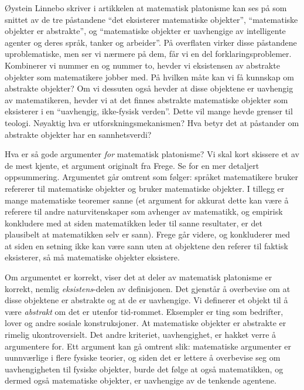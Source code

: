 \documentclass[12pt, norsk]{article}
\begin{document}
Øystein Linnebo skriver i artikkelen \cite{platonism} at matematisk platonisme kan ses på som snittet av de tre påstandene ``det eksisterer matematiske objekter'', ``matematiske objekter er abstrakte'', og ``matematiske objekter er uavhengige av intelligente agenter og deres språk, tanker og arbeider''. På overflaten virker disse påstandene uproblematiske, men ser vi nærmere på dem, får vi en del forklaringsproblemer. Kombinerer vi nummer en og nummer to, hevder vi eksistensen av abstrakte objekter som matematikere jobber med. På hvilken måte kan vi få kunnskap om abstrakte objekter? Om vi dessuten også hevder at disse objektene er uavhengig av matematikeren, hevder vi at det finnes abstrakte matematiske objekter som eksisterer i en ``uavhengig, ikke-fysisk verden''. Dette vil mange hevde grenser til teologi. Nøyaktig hva er utforskningsmekanismen? Hva betyr det at påstander om abstrakte objekter har en sannhetsverdi? 

Hva er så gode argumenter \emph{for} matematisk platonisme? Vi skal kort skissere et av de mest kjente, et argument originalt fra Frege. Se \cite{linnebo_artikkel} for en mer detaljert oppsummering. Argumentet går omtrent som følger: språket matematikere bruker refererer til matematiske objekter og bruker matematiske objekter. I tillegg er mange matematiske teoremer sanne (et argument for akkurat dette kan være å referere til andre naturvitenskaper som avhenger av matematikk, og empirisk konkludere med at siden matematikken leder til sanne resultater, er det plausibelt at matematikken selv er sann). Frege går videre, og konkluderer med at siden en setning ikke kan være sann uten at objektene den referer til faktisk eksisterer, så må matematiske objekter eksistere.

Om argumentet er korrekt, viser det at deler av matematisk platonisme er korrekt, nemlig \emph{eksistens}-delen av definisjonen. Det gjenstår å overbevise om at disse objektene er abstrakte og at de er uavhengige. Vi definerer et objekt til å være \emph{abstrakt} om det er utenfor tid-rommet. Eksempler er ting som bedrifter, lover og andre sosiale konstruksjoner. At matematiske objekter er abstrakte er rimelig ukontroversielt. Det andre kriteriet, uavhengighet, er hakket verre å argumentere for. Ett argument kan gå omtrent slik: matematiske argumenter er uunnværlige i flere fysiske teorier, og siden det er lettere å overbevise seg om uavhengigheten til fysiske objekter, burde det følge at også matematikken, og dermed også matematiske objekter, er uavhengige av de tenkende agentene. 
\end{document}
